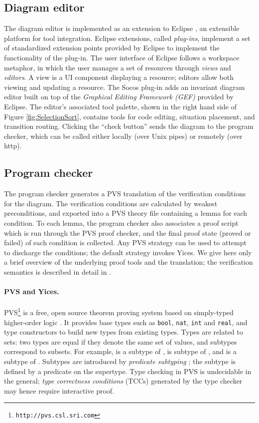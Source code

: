 \documentclass[english,submission]{eptcs}
\begin{document}
\subsection{Diagram editor}

The diagram editor is implemented as an extension to Eclipse
\cite{eclipse}, an extensible platform for tool integration. Eclipse
extensions, called \emph{plug-ins}, implement a set of standardized
extension points provided by Eclipse to implement the functionality of
the plug-in.  The user interface of Eclipse follows a workspace
metaphor, in which the user manages a set of resources through
\emph{views }and \emph{editors}.  A view is a UI component displaying
a resource; editors allow both viewing and updating a resource.  The
Socos plug-in adds an invariant diagram editor built on top of the
\emph{Graphical Editing Framework (GEF)} provided by Eclipse. The
editor's associated tool palette, shown in the right hand side of
Figure \ref{fig:SelectionSort}, contains tools for code editing,
situation placement, and transition routing. Clicking the {}``check
button'' sends the diagram to the program checker, which can be
called either locally (over Unix pipes) or remotely (over http).


\subsection{Program checker}

The program checker generates a PVS translation of the verification
conditions for the diagram. The verification conditions are
calculated by weakest preconditions, and exported into a PVS theory
file containing a lemma for each condition. To each lemma, the program
checker also associates a proof script which is run through the PVS
proof checker, and the final proof state (proved or failed) of each
condition is collected. Any PVS strategy can be used to attempt to
discharge the conditions; the default strategy invokes Yices. We give
here only a brief overview of the underlying proof tools and the translation;
the verification semantics is described in detail in \cite{inpErBa10}.


\paragraph{PVS and Yices.}

PVS\footnote{\texttt{http://pvs.csl.sri.com}} is a free, open source theorem proving system based on simply-typed
higher-order logic \cite{PVS-Semantics:TR}. It provides base types
such as \texttt{bool}, \texttt{nat}, \texttt{int} and \texttt{real},
and type constructors to build new types from existing types. Types
are related to sets: two types are equal if they denote the same set
of values, and subtypes correspond to subsets. For example, 
is a subtype of ,  is subtype of ,
and  is a subtype of . Subtypes
are introduced by \emph{predicate subtyping} \cite{Rushby98:TSE};
the subtype is defined by a predicate on the supertype. Type checking
in PVS is undecidable in the general; \emph{type correctness conditions
}(TCCs) generated by the type checker may hence require interactive
proof.
\end{document}
